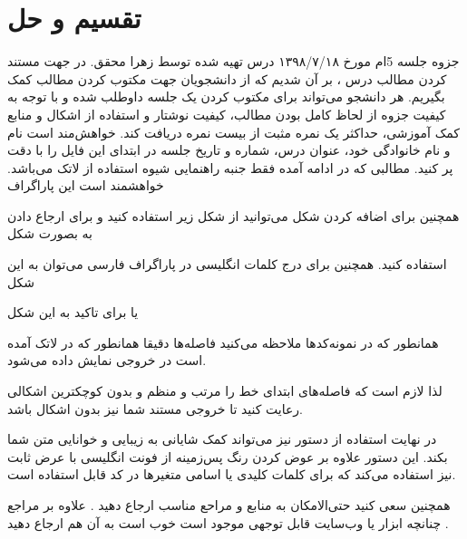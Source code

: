 
\def \Subject {تقسیم و حل}
\def \Author {زهرا محقق}
\def \Date {۱۳۹۸/۷/۱۸}
\def \Session {5}
\setcounter{chapter}{\Session-1}

\chapter{\Subject}
\chapterauthor{\Author~ - \Date}

جزوه جلسه
\Session ام
 مورخ 
\Date
درس 
\CourseName
 تهیه شده توسط
 \Author.
در جهت مستند کردن مطالب درس 
\CourseName
، بر آن شدیم که از دانشجویان جهت مکتوب کردن مطالب کمک بگیریم. هر دانشجو می‌تواند برای مکتوب کردن یک جلسه داوطلب شده و با توجه به کیفیت جزوه از لحاظ کامل بودن مطالب، کیفیت نوشتار و استفاده از اشکال و منابع کمک آموزشی، حداکثر یک نمره مثبت از بیست نمره دریافت کند. خواهش‌مند است نام و نام خانوادگی خود، عنوان درس، شماره و تاریخ جلسه در ابتدای این فایل را با دقت پر کنید. مطالبی که در ادامه آمده فقط جنبه راهنمایی شیوه استفاده از لاتک می‌باشد. خواهشمند است این پاراگراف 

همچنین برای اضافه کردن شکل می‌توانید از شکل زیر استفاده کنید و برای ارجاع دادن به بصورت شکل

 استفاده کنید.
 همچنین برای درج کلمات انگلیسی در پاراگراف فارسی می‌توان به این شکل

 یا برای تاکید به این شکل
 
همانطور که در نمونه‌کدها ملاحظه می‌کنید فاصله‌ها دقیقا همانطور که در لاتک آمده است در خروجی نمایش داده می‌شود.
 


لذا لازم است که فاصله‌های ابتدای خط را مرتب و منظم و بدون کوچکترین اشکالی رعایت کنید تا خروجی مستند شما نیز بدون اشکال باشد.


در نهایت استفاده از دستور 
نیز می‌تواند کمک شایانی به زیبایی و خوانایی متن شما بکند. این دستور علاوه بر عوض کردن رنگ پس‌زمینه از فونت انگلیسی با عرض ثابت نیز استفاده می‌کند که برای کلمات کلیدی یا اسامی متغیرها در کد قابل استفاده است.



همچنین سعی کنید حتی‌الامکان به منابع و مراحع مناسب ارجاع دهید
\cite{CLRS}. 
علاوه بر مراجع چنانچه ابزار یا وب‌سایت قابل توجهی موجود است خوب است به آن هم ارجاع دهید
\cite{visualizationwebsite}. 

